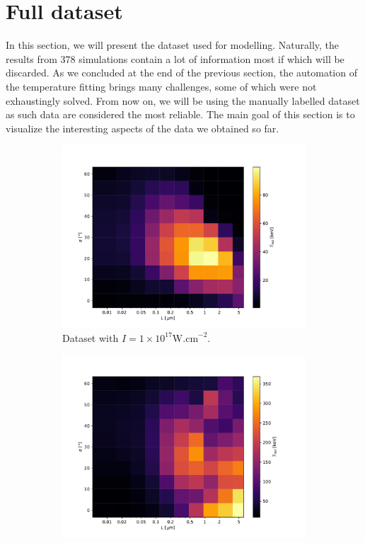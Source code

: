 \section{Full dataset}
In this section, we will present the dataset used for modelling. Naturally, the results from 378 simulations contain a lot of information most if which will be discarded. As we concluded at the end of the previous section, the automation of the temperature fitting brings many challenges, some of which were not exhaustingly solved. From now on, we will be using the manually labelled dataset as such data are considered the most reliable. The main goal of this section is to visualize the interesting aspects of the data we obtained so far.
\begin{figure}[ht]
	\centering
	\begin{subfigure}{0.49\textwidth}
		\centering
		\includegraphics[width=\textwidth]{figures/I_1e17t_hot}
		\caption{Dataset with $I = 1 \times 10^{17} \mathrm{W.cm}^{-2}$.}
		\label{fig:dataset1-a}
	\end{subfigure}
	\hfill
	\begin{subfigure}{0.49\textwidth}
		\centering
		\includegraphics[width=\textwidth]{figures/I_1e18t_hot}

\end{subfigure}
\end{figure}
